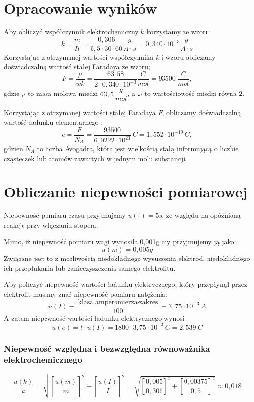 \documentclass[a4paper,11pt]{article}
\begin{document}
\section{Opracowanie wyników}
Aby obliczyć współczynnik elektrochemiczny $k$ korzystamy ze wzoru:
$$
k = \frac{m}{I t} = \frac{0,306}{0,5 \cdot 30 \cdot 60} \frac{g}{A \cdot s}  = 0,340 \cdot 10^{-3} \frac{g}{A \cdot s} 
$$
Korzystając z otrzymanej wartości współczynnika  $k$ i  wzoru obliczamy doświadczalną wartość stałej Faradaya ze wzoru;
$$
F = \frac{\mu}{w k} = \frac{63,58 }{2 \cdot 0,340 \cdot 10^{-3}} \frac{C}{mol} = 93500~\frac{C}{mol}, 
$$
gdzie $\mu$ to masa molowa miedzi $63,5~\dfrac{g}{mol}$, a $w$ to wartościowość miedzi równa 2.

Korzystając z otrzymanej wartości stałej Faradaya  $F$, obliczamy doświadczalną wartość ładunku elementarnego :
$$
e = \frac{F}{N_A} = \frac{93500}{6,0222 \cdot 10^{23}}~C = 1,552 \cdot 10^{-19}~C,  
$$
gdzien $N_A$ to liczba Avogadra, która jest wielkością stałą informującą o liczbie cząsteczek lub atomów zawartych w jednym molu substancji. 
\section{Obliczanie niepewności pomiarowej}
Niepewność pomiaru czasu przyjmujemy $u(t)=5s$, ze względu na opóźnioną reakcję przy włączaniu stopera. 

Mimo, iż niepewność pomiaru wagi wynosiła 0,001g my przyjmujemy ją jako:
$$
u(m) = 0,005 g
$$
Związane jest to z możliwością niedokładnego wysuszenia elektrod, niedokładnego ich przepłukania lub zanieczyszczenia samego elektrolitu.

Aby policzyć niepewność wartości ładunku elektrycznego, który przepłynął przez elektrolit musimy znać niepewność pomiaru natężenia:
$$
u(I) = \frac{\text{klasa amperomierza} \cdot \text{zakres}}{100} = 3,75 \cdot 10^{-3}~A
$$
A zatem niepewność wartości ładunku elektrycznego wynosi:
$$
u(e) = t \cdot u(I) = 1800 \cdot 3,75 \cdot 10^{-3} ~C= 2,539 ~C
$$

\subsubsection*{Niepewność względna i bezwzględna  równoważnika elektrochemicznego}  

$$
\frac{u(k)}{k} = \sqrt{\left[\frac{u(m)}{m} \right]^2 + \left[\frac{u(I)}{I} \right]^2 } = \sqrt{\left[\frac{ 0,005}{0,306} \right]^2 + \left[\frac{0,00375}{0,5} \right]^2 } \approx 0,018
$$
\end{document}
